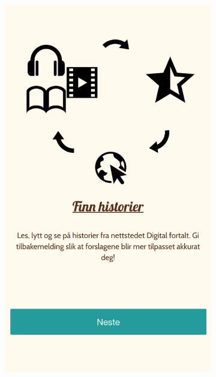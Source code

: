 \begin{appendices}
\begin{figure}[h!]
\begin{subfigure}[h]{0.32\textwidth}
			\caption{}
		\end{subfigure}
		\begin{subfigure}[h]{0.32\textwidth}
			\includegraphics[width=\textwidth]{fig/screenshot_intro2}
			\caption{}
		\end{subfigure}
		\begin{subfigure}[h]{0.32\textwidth}

\end{subfigure}
\end{figure}
\end{appendices}
